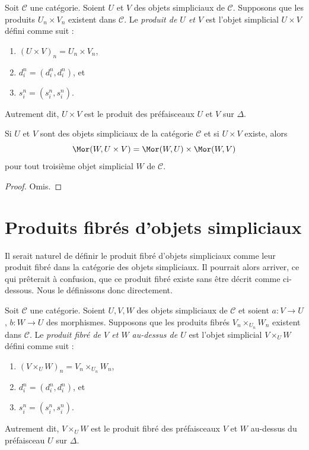 \begin{definition}
\label{definition-product}
Soit $\mathcal{C}$ une catégorie. Soient $U$ et $V$ des objets simpliciaux
de $\mathcal{C}$. Supposons que les produits $U_n \times V_n$ existent
dans $\mathcal{C}$. Le {\it produit de $U$ et $V$} est l'objet simplicial
$U \times V$ défini comme suit :
\begin{enumerate}
\item $(U \times V)_n = U_n \times V_n$,
\item $d^n_i = (d^n_i, d^n_i)$, et
\item $s^n_i = (s^n_i, s^n_i)$.
\end{enumerate}
Autrement dit, $U \times V$ est le produit des préfaisceaux $U$ et $V$
sur $\Delta$.
\end{definition}

\begin{lemma}
\label{lemma-product}
Si $U$ et $V$ sont des objets simpliciaux de la catégorie $\mathcal{C}$
et si $U \times V$ existe, alors
$$
\Mor(W, U \times V) =
\Mor(W, U) \times
\Mor(W, V)
$$
pour tout troisième objet simplicial $W$ de $\mathcal{C}$.
\end{lemma}

\begin{proof}
Omis.
\end{proof}


\section{Produits fibrés d'objets simpliciaux}
\label{section-fibre-products}

\noindent
Il serait naturel de définir le produit fibré d'objets simpliciaux comme
leur produit fibré dans la catégorie des objets simpliciaux. Il pourrait
alors arriver, ce qui prêterait à confusion, que ce produit fibré existe
sans être décrit comme ci-dessous. Nous le définissons donc directement.

\begin{definition}
\label{definition-fibre-product}
Soit $\mathcal{C}$ une catégorie. Soient $U, V, W$ des objets simpliciaux
de $\mathcal{C}$ et soient $a : V \to U$, $b : W \to U$ des morphismes.
Supposons que les produits fibrés $V_n \times_{U_n} W_n$ existent dans
$\mathcal{C}$. Le {\it produit fibré de $V$ et $W$ au-dessus de $U$}
est l'objet simplicial $V \times_U W$ défini comme suit :
\begin{enumerate}
\item $(V \times_U W)_n = V_n \times_{U_n} W_n$,
\item $d^n_i = (d^n_i, d^n_i)$, et
\item $s^n_i = (s^n_i, s^n_i)$.
\end{enumerate}
Autrement dit, $V \times_U W$ est le produit fibré des préfaisceaux
$V$ et $W$ au-dessus du préfaisceau $U$ sur $\Delta$.
\end{definition}

